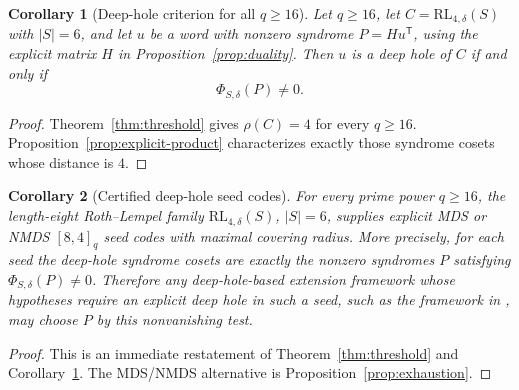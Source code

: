 \documentclass[11pt]{article}
\newcommand{\RL}{\mathrm{RL}}
\theoremstyle{plain}
\newtheorem{corollary}{Corollary}
\theoremstyle{definition}
\begin{document}
\begin{corollary}[Deep-hole criterion for all \(q\ge16\)]
\label{cor:explicit-deepholes}
Let \(q\ge16\), let \(C=\RL_{4,\delta}(S)\) with \(|S|=6\), and let \(u\)
be a word with nonzero syndrome \(P=Hu^{\mathsf T}\), using the explicit
matrix \(H\) in Proposition~\ref{prop:duality}.  Then \(u\) is a deep hole
of \(C\) if and only if
\[
  \Phi_{S,\delta}(P)\ne0.
\]
\end{corollary}

\begin{proof}
Theorem~\ref{thm:threshold} gives \(\rho(C)=4\) for every \(q\ge16\).
Proposition~\ref{prop:explicit-product} characterizes exactly those
syndrome cosets whose distance is \(4\).
\end{proof}

\begin{corollary}[Certified deep-hole seed codes]\label{cor:seed-codes}
For every prime power \(q\ge16\), the length-eight Roth--Lempel family
\(\RL_{4,\delta}(S)\), \(|S|=6\), supplies explicit MDS or NMDS
\([8,4]_q\) seed codes with maximal covering radius.  More precisely, for
each seed the deep-hole syndrome cosets are exactly the nonzero syndromes
\(P\) satisfying \(\Phi_{S,\delta}(P)\ne0\).  Therefore any
deep-hole-based extension framework whose hypotheses require an explicit
deep hole in such a seed, such as the framework in
\cite{LiLuLingLam2026}, may choose \(P\) by this nonvanishing test.
\end{corollary}

\begin{proof}
This is an immediate restatement of Theorem~\ref{thm:threshold} and
Corollary~\ref{cor:explicit-deepholes}.  The MDS/NMDS alternative is
Proposition~\ref{prop:exhaustion}.
\end{proof}
\end{document}
